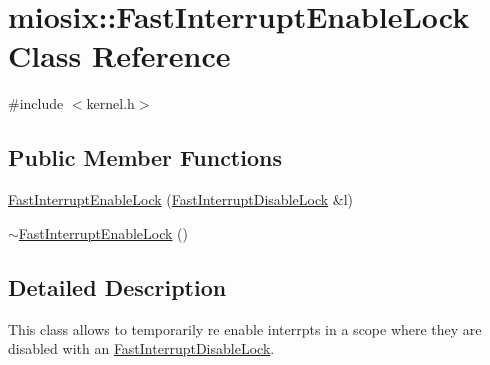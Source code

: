 \hypertarget{classmiosix_1_1_fast_interrupt_enable_lock}{\section{miosix\-:\-:Fast\-Interrupt\-Enable\-Lock Class Reference}
\label{classmiosix_1_1_fast_interrupt_enable_lock}
}


{\ttfamily \#include $<$kernel.\-h$>$}

\subsection*{Public Member Functions}
\begin{DoxyCompactItemize}
\item 
\hyperlink{classmiosix_1_1_fast_interrupt_enable_lock_a1d0dc9ea0ee452a36d300b84c5e30a83}{Fast\-Interrupt\-Enable\-Lock} (\hyperlink{classmiosix_1_1_fast_interrupt_disable_lock}{Fast\-Interrupt\-Disable\-Lock} \&l)
\item 
\hyperlink{classmiosix_1_1_fast_interrupt_enable_lock_afb021a03eb3c46a8b8ee8d7854190f8c}{$\sim$\-Fast\-Interrupt\-Enable\-Lock} ()
\end{DoxyCompactItemize}


\subsection{Detailed Description}
This class allows to temporarily re enable interrpts in a scope where they are disabled with an \hyperlink{classmiosix_1_1_fast_interrupt_disable_lock}{Fast\-Interrupt\-Disable\-Lock}. 

